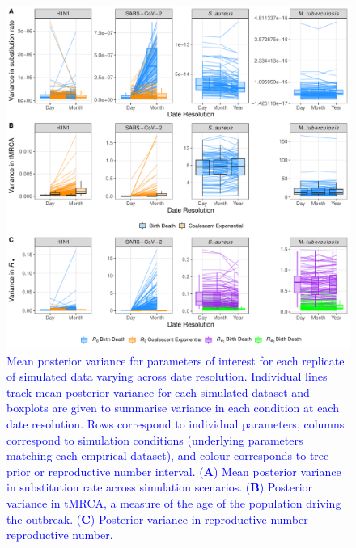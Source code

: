 \documentclass[12pt]{article}
\begin{document}
\renewcommand{\thefigure}{S\arabic{figure}}
\renewcommand{\thetable}{S\arabic{table}}
\setcounter{figure}{0}
\setcounter{table}{0}

\begin{figure}[H]
    \centering
    \includegraphics[width=\textwidth]{figures/simulation_variance_panel.pdf}
    \caption{\textcolor{blue}{Mean posterior variance for parameters of interest for each replicate of simulated data varying across date resolution. Individual lines track mean posterior variance for each simulated dataset and boxplots are given to summarise variance in each condition at each date resolution. Rows correspond to individual parameters, columns correspond to simulation conditions (underlying parameters matching each empirical dataset), and colour corresponds to tree prior or reproductive number interval. (\textbf{A}) Mean posterior variance in substitution rate across simulation scenarios. (\textbf{B}) Posterior variance in tMRCA, a measure of the age of the population driving the outbreak. (\textbf{C}) Posterior variance in reproductive number reproductive number.}}
    \label{fig:variance}
\end{figure}
\end{document}
